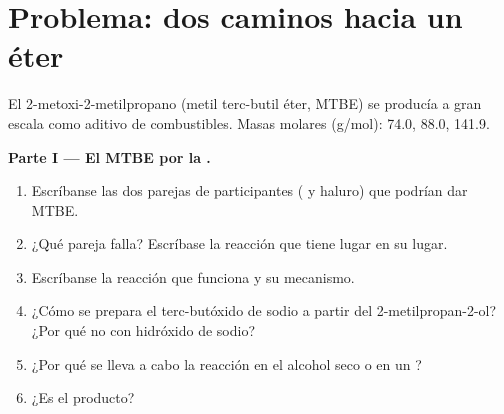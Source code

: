 \section{Problema: dos caminos hacia un éter}

\begin{problem}
\label{pb:b1:alcohol-activation:1}
El 2-metoxi-2-metilpropano (metil terc-butil éter, MTBE) se producía a
gran escala como aditivo de combustibles. Masas molares (\unit{g/mol}):
74.0,  88.0,  141.9.

\medskip
\noindent\textbf{Parte I --- El MTBE por la .}
\begin{enumerate}
  \item Escríbanse las dos parejas de participantes ( y haluro)
        que podrían dar MTBE.
  \item ¿Qué pareja falla? Escríbase la reacción que tiene lugar en su
        lugar.
  \item Escríbanse la reacción que funciona y su mecanismo.
  \item ¿Cómo se prepara el terc-butóxido de sodio a partir del
        2-metilpropan-2-ol? ¿Por qué no con hidróxido de sodio?
  \item ¿Por qué se lleva a cabo la reacción en el alcohol seco o en un
        ?
  \item ¿Es  el producto?
\end{enumerate}


\end{problem}
